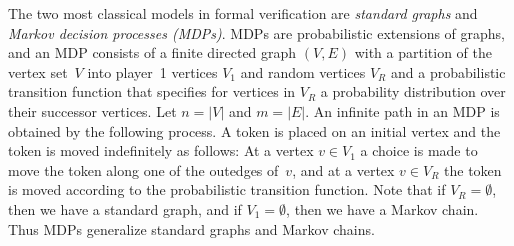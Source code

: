\documentclass[11pt,letterpaper]{article}
\newcommand{\lu}{\textup{(}}
\newcommand{\ru}{\textup{)}\xspace}
\newcommand{\upbr}[1]{\lu #1\ru}
\newcommand{\vo}{V_1\xspace}
\newcommand{\vr}{V_R\xspace}
\begin{document}
\smallskip{} 
The two most classical models in formal verification are 
\emph{standard graphs} and \emph{Markov decision processes \upbr{MDPs}}. 
MDPs are probabilistic extensions of graphs, 
and an MDP consists of a finite 
directed graph $(V,E)$ with a partition of the vertex set~$V$ into 
player~1 vertices $\vo$ and random vertices $\vr$
and a probabilistic transition function that specifies for vertices in $\vr$
a probability distribution over their successor vertices. 
Let $n = |V|$ and $m = |E|$. 
An infinite path in an MDP is obtained by the following process. 
A token is placed on an initial vertex and the token is moved indefinitely 
as follows: At a vertex $v \in \vo$ a choice is made to move the token along 
one of the outedges of~$v$, and at a vertex $v \in \vr$ the token is moved 
according to the probabilistic transition function. 
Note that if $\vr=\emptyset$, then we have a standard graph, and 
if $\vo=\emptyset$, then we have a Markov chain.
Thus MDPs generalize standard graphs and Markov chains.
\end{document}
